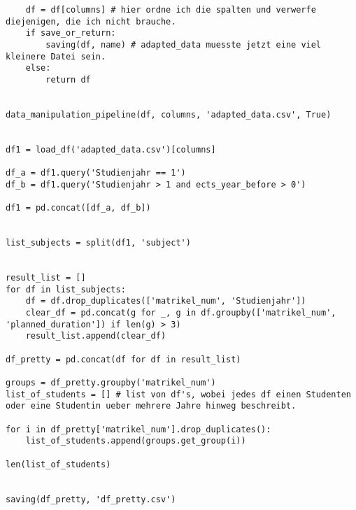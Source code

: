 \begin{lstlisting}
    df = df[columns] # hier ordne ich die spalten und verwerfe diejenigen, die ich nicht brauche.
    if save_or_return:
        saving(df, name) # adapted_data muesste jetzt eine viel kleinere Datei sein.
    else:
        return df

    
data_manipulation_pipeline(df, columns, 'adapted_data.csv', True)
    

df1 = load_df('adapted_data.csv')[columns]

df_a = df1.query('Studienjahr == 1')
df_b = df1.query('Studienjahr > 1 and ects_year_before > 0')

df1 = pd.concat([df_a, df_b]) 


list_subjects = split(df1, 'subject')


result_list = []
for df in list_subjects:
    df = df.drop_duplicates(['matrikel_num', 'Studienjahr'])
    clear_df = pd.concat(g for _, g in df.groupby(['matrikel_num', 'planned_duration']) if len(g) > 3)
    result_list.append(clear_df)
    
df_pretty = pd.concat(df for df in result_list)

groups = df_pretty.groupby('matrikel_num')
list_of_students = [] # list von df's, wobei jedes df einen Studenten oder eine Studentin ueber mehrere Jahre hinweg beschreibt.

for i in df_pretty['matrikel_num'].drop_duplicates():
    list_of_students.append(groups.get_group(i))
    
len(list_of_students)


saving(df_pretty, 'df_pretty.csv')





\end{lstlisting}


\newpage


